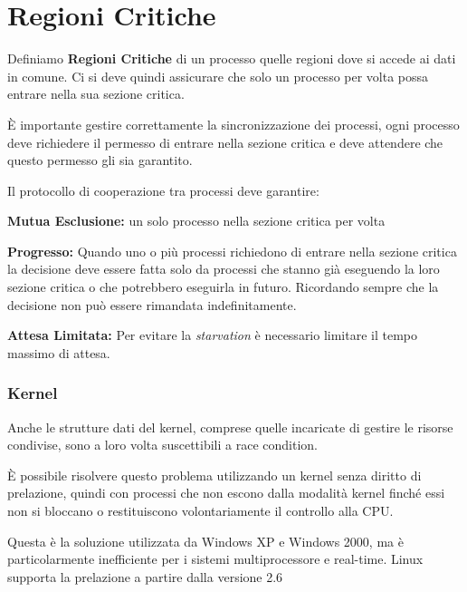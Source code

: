 \section{Regioni Critiche}
Definiamo \textbf{Regioni Critiche} di un processo quelle regioni dove si accede ai dati in comune. Ci si deve quindi assicurare che solo un processo per volta possa entrare nella sua sezione critica.

\spacer
È importante gestire correttamente la sincronizzazione dei processi, ogni processo deve richiedere il permesso di entrare nella sezione critica e deve attendere che questo permesso gli sia garantito.

\spacer
Il protocollo di cooperazione tra processi deve garantire:
\begin{sitemize}
    \item \textbf{Mutua Esclusione:} un solo processo nella sezione critica per volta
    \item \textbf{Progresso:} Quando uno o più processi richiedono di entrare nella sezione critica la decisione deve essere fatta solo da processi che stanno già eseguendo la loro sezione critica o che potrebbero eseguirla in futuro. Ricordando sempre che la decisione non può essere rimandata indefinitamente.
    \item \textbf{Attesa Limitata:} Per evitare la \textit{starvation} è necessario limitare il tempo massimo di attesa.
\end{sitemize}

\subsubsection*{Kernel}
Anche le strutture dati del kernel, comprese quelle incaricate di gestire le risorse condivise, sono a loro volta suscettibili a race condition.

\spacer
È possibile risolvere questo problema utilizzando un kernel senza diritto di prelazione, quindi con processi che non escono dalla modalità kernel finché essi non si bloccano o restituiscono volontariamente il controllo alla CPU.

Questa è la soluzione utilizzata da Windows XP e Windows 2000, ma è particolarmente inefficiente per i sistemi multiprocessore e real-time.
Linux supporta la prelazione a partire dalla versione 2.6
